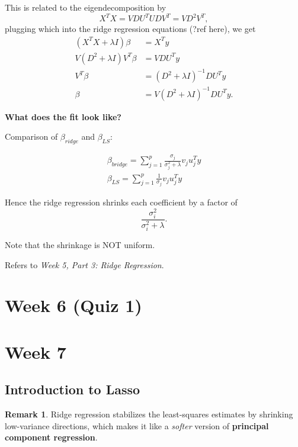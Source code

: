 \documentclass[11pt]{article}
\theoremstyle{definition}
\newtheorem{remark}{Remark}[section]
\numberwithin{equation}{section}
\begin{document}
This is related to the eigendecomposition by
\begin{equation}
  X^TX=VDU^TUDV^T=VD^2V^T,
\end{equation}
plugging which into the ridge regression equations (?ref here), we get
\begin{align}
  (X^TX+\lambda I)\beta&=X^Ty\\
  V(D^2+\lambda I)V^T\beta&=VDU^Ty\\
  V^T\beta&=(D^2+\lambda I)^{-1}DU^Ty\\
  \beta&=V(D^2+\lambda I)^{-1}DU^Ty.
\end{align}

\textbf{What does the fit look like?}

Comparison of $\beta_{ridge}$ and $\beta_{LS}$:

\begin{gather}
  \beta_{bridge}=\sum^p_{j=1}\frac{\sigma_j}{\sigma_j^2+\lambda}v_ju_j^Ty\\
  \beta_{LS}=\sum^p_{j=1}\frac{1}{\sigma_j}v_ju_j^Ty
\end{gather}

Hence the ridge regression shrinks each coefficient by a factor of
\begin{equation}
  \frac{\sigma^2_i}{\sigma^2_i+\lambda}.
\end{equation}
\begin{writenotes}
  Note that the shrinkage is NOT uniform.

  Refers to \textit{Week 5, Part 3: Ridge Regression}.
\end{writenotes}


\section{Week 6 (Quiz 1)}

\newpage

\section{Week 7}
\subsection{Introduction to Lasso}

\begin{remark}
  Ridge regression stabilizes the least-squares estimates by shrinking low-variance directions, which makes it like a \textit{softer} version of \textbf{principal component regression}.
\end{remark}
\end{document}
